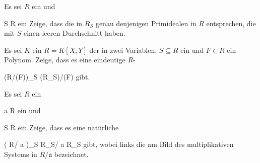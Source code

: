 {}
{





Es sei $R$ ein
und

\mavergleichskette
{\vergleichskette
{ S
}
{ \subseteq }{ R
}
{  }{
}
{    }{
}
{   }{
}
}
{}{}{}
ein
Zeige, dass die
in $R_S$ genau denjenigen Primidealen in $R$  entsprechen, die mit $S$  einen leeren Durchschnitt haben.





}
{} {}

{}
{





Es sei $K$ ein
$R=K[X,Y]$ der
in zwei Variablen, $S \subseteq R$ ein
und $F \in R$ ein Polynom. Zeige, dass es eine eindeutige
$R$-

\mavergleichskettedisp
{\vergleichskette
{ (R/(F))_S
}
{ \cong} { (R_S)/(F)
}
{ } {
}
{ } {
}
{ } {
}
}
{}{}{}
gibt.





}
{} {}

{}
{





Es sei $R$ ein

\mavergleichskette
{\vergleichskette
{ {\mathfrak a}
}
{ \subseteq }{ R
}
{  }{
}
{    }{
}
{   }{
}
}
{}{}{}
ein
und

\mavergleichskette
{\vergleichskette
{S
}
{ \subseteq }{ R
}
{  }{
}
{    }{
}
{   }{
}
}
{}{}{}
ein
Zeige, dass es eine natürliche

\mavergleichskettedisp
{\vergleichskette
{ \left(  R/ {\mathfrak a}  \right)_S
}
{ \cong} { R_S/ {\mathfrak a} R_S
}
{ } {
}
{ } {
}
{ } {
}
}
{}{}{}
gibt, wobei links die
am Bild des multiplikativen Systems in $R/ {\mathfrak a}$ bezeichnet.





}
{} {}

